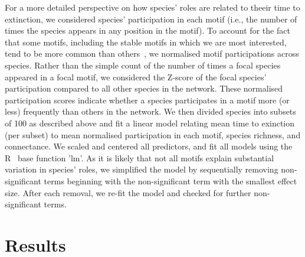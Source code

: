 \documentclass[12pt]{article}
\begin{document}
			For a more detailed perspective on how species' roles are related to theeir time to extinction, we considered species' participation in each motif (i.e., the number of times the species appears in any position in the motif). To account for the fact that some motifs, including the stable motifs in which we are most interested, tend to be more common than others~\citep{Stouffer2007}, we normalised motif participations across species. Rather than the simple count of the number of times a focal species appeared in a focal motif, we considered the Z-score of the focal species' participation compared to all other species in the network. These normalised participation scores indicate whether a species participates in a motif more (or less) frequently than others in the network. We then divided species into subsets of 100 as described above and fit a linear model relating mean time to exinction (per subset)  to mean normalised participation in each motif, species richness, and connectance.  We scaled and centered all predictors, and fit all models using the R~\citep{R} base function 'lm'.
			As it is likely that not all motifs explain substantial variation in species' roles, we simplified the model by sequentially removing non-significant terms beginning with the non-significant term with the smallest effect size. After each removal, we re-fit the model and checked for further non-significant terms.







\section{Results}
\end{document}
